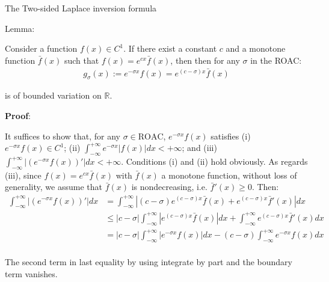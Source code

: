 \documentclass{beamer}
\begin{document}
\begin{frame}{The Two-sided Laplace inversion formula}


    {\footnotesize \scriptsize
    \par Lemma: 
    \par Consider a function \( f(x) \in C^1 \). If there exist
     a constant \( c \) and a monotone function \( \bar{f}(x) \) such that \( f(x) = e^{cx} \bar{f}(x) \), then 
     then for any \(\sigma\) in the ROAC:
     \begin{align*}
        g_{\sigma}(x) := e^{-\sigma x} f(x) = e^{(c - \sigma)x} \bar{f}(x)
     \end{align*}
     \par is of bounded variation on \(\mathbb{R}\).
     \par  \pause \textbf{Proof}:
     \par It suffices to show that, for any \(\sigma \in \text{ROAC}\), \(e^{-\sigma x} f(x)\) 
     satisfies (i) \(e^{-\sigma x} f(x) \in C^1\); (ii) \(\int_{-\infty}^{+\infty} e^{-\sigma x} |f(x)|  dx < +\infty\); 
     and (iii) \(\int_{-\infty}^{+\infty} |(e^{-\sigma x} f(x))'|  dx < +\infty\). Conditions (i) and (ii) hold obviously. 
     As regards (iii), since \(f(x) = e^{cx} \bar{f}(x)\) with \(\bar{f}(x)\) a monotone function, 
     without loss of generality, we assume that \(\bar{f}(x)\) is nondecreasing, i.e. \(\bar{f}'(x) \geq 0\). Then:
      \pause 
     \begin{align*}
        \int_{-\infty}^{+\infty} |(e^{-\sigma x} f(x))'|  dx 
        & = \int_{-\infty}^{+\infty} |(c - \sigma) e^{(c - \sigma)x} \bar{f}(x) + e^{(c - \sigma)x} \bar{f}'(x)|  dx\\
        &\leq |c - \sigma| \int_{-\infty}^{+\infty} |e^{(c - \sigma)x} \bar{f}(x)|  dx + \int_{-\infty}^{+\infty} e^{(c - \sigma)x} \bar{f}'(x)  dx\\
        &= |c - \sigma| \int_{-\infty}^{+\infty} |e^{-\sigma x} f(x)|  dx - (c - \sigma) \int_{-\infty}^{+\infty} e^{-\sigma x} f(x)  dx\\
     \end{align*}
         \vspace{-3em}
      \par The second term in last equality by using integrate by part and the boundary term vanishes.
 
    }
    
\end{frame}
\end{document}
